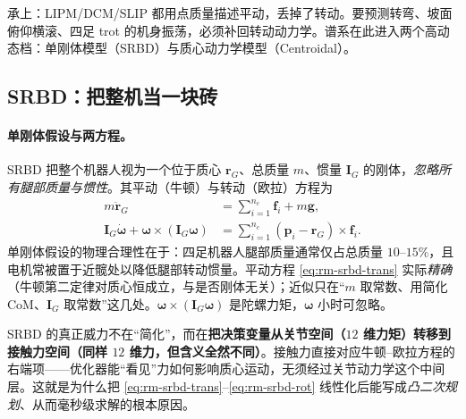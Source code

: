 承上：LIPM/DCM/SLIP 都用点质量描述平动，丢掉了转动。要预测转弯、坡面俯仰横滚、四足 trot 的机身振荡，必须补回转动动力学。谱系在此进入两个高动态档：单刚体模型（SRBD）与质心动力学模型（Centroidal）。

\subsection{SRBD：把整机当一块砖}
\label{subsec:rm-srbd}

\paragraph{单刚体假设与两方程。}
SRBD 把整个机器人视为一个位于质心 $\mathbf{r}_G$、总质量 $m$、惯量 $\mathbf{I}_G$ 的刚体，\emph{忽略所有腿部质量与惯性}。其平动（牛顿）与转动（欧拉）方程为
\begin{align}
  m\ddot{\mathbf{r}}_G&=\sum_{i=1}^{n_c}\mathbf{f}_i+m\mathbf{g},
  \label{eq:rm-srbd-trans}\\
  \mathbf{I}_G\dot{\boldsymbol{\omega}}+\boldsymbol{\omega}\times(\mathbf{I}_G\boldsymbol{\omega})
  &=\sum_{i=1}^{n_c}(\mathbf{p}_i-\mathbf{r}_G)\times\mathbf{f}_i.
  \label{eq:rm-srbd-rot}
\end{align}
单刚体假设的物理合理性在于：四足机器人腿部质量通常仅占总质量 $10$–$15\%$，且电机常被置于近髋处以降低腿部转动惯量。平动方程 \cref{eq:rm-srbd-trans} 实际\emph{精确}（牛顿第二定律对质心恒成立，与是否刚体无关）；近似只在“$m$ 取常数、用简化 CoM、$\mathbf{I}_G$ 取常数”这几处。$\boldsymbol{\omega}\times(\mathbf{I}_G\boldsymbol{\omega})$ 是陀螺力矩，$\boldsymbol{\omega}$ 小时可忽略。

\begin{insight}
SRBD 的真正威力不在“简化”，而在\textbf{把决策变量从关节空间（$12$ 维力矩）转移到接触力空间（同样 $12$ 维力，但含义全然不同）}。接触力直接对应牛顿–欧拉方程的右端项——优化器能“看见”力如何影响质心运动，无须经过关节动力学这个中间层。这就是为什么把 \cref{eq:rm-srbd-trans}--\cref{eq:rm-srbd-rot} 线性化后能写成\emph{凸二次规划}、从而毫秒级求解的根本原因。
\end{insight}

